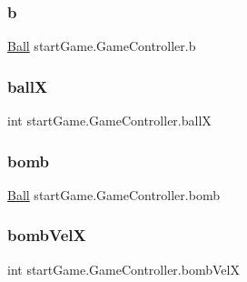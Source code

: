 \subsubsection{\texorpdfstring{b}{b}}
{\footnotesize\ttfamily \hyperlink{classmodel_1_1_ball}{Ball} start\+Game.\+Game\+Controller.\+b\hspace{0.3cm}{\ttfamily [private]}}

\hypertarget{classstart_game_1_1_game_controller_a122256563a1c8df92c4c9d7549f68fd3}{}\label{classstart_game_1_1_game_controller_a122256563a1c8df92c4c9d7549f68fd3} 
\subsubsection{\texorpdfstring{ballX}{ballX}}
{\footnotesize\ttfamily int start\+Game.\+Game\+Controller.\+ballX\hspace{0.3cm}{\ttfamily [private]}}

\hypertarget{classstart_game_1_1_game_controller_a5196356364a188386c9632e2aed1f105}{}\label{classstart_game_1_1_game_controller_a5196356364a188386c9632e2aed1f105} 
\subsubsection{\texorpdfstring{bomb}{bomb}}
{\footnotesize\ttfamily \hyperlink{classmodel_1_1_ball}{Ball} start\+Game.\+Game\+Controller.\+bomb\hspace{0.3cm}{\ttfamily [private]}}

\hypertarget{classstart_game_1_1_game_controller_a131f6061e92a4e5d4f44d6cfb698dfed}{}\label{classstart_game_1_1_game_controller_a131f6061e92a4e5d4f44d6cfb698dfed} 
\subsubsection{\texorpdfstring{bomb\+VelX}{bombVelX}}
{\footnotesize\ttfamily int start\+Game.\+Game\+Controller.\+bomb\+VelX\hspace{0.3cm}{\ttfamily [private]}}

